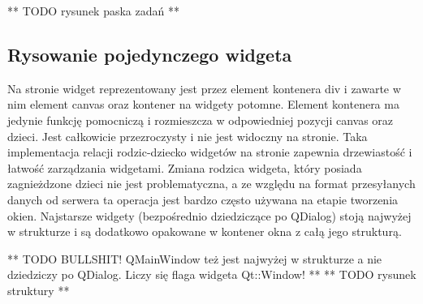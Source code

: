 ** TODO rysunek paska zadań **

\subsection{Rysowanie pojedynczego widgeta}
Na stronie widget reprezentowany jest przez element kontenera div i zawarte w nim element canvas oraz kontener na widgety potomne. Element kontenera ma jedynie funkcję pomocniczą i rozmieszcza w odpowiedniej pozycji canvas oraz dzieci. Jest całkowicie przezroczysty i nie jest widoczny na stronie. Taka implementacja relacji rodzic-dziecko widgetów na stronie zapewnia drzewiastość i łatwość zarządzania widgetami. Zmiana rodzica widgeta, który posiada zagnieżdzone dzieci nie jest problematyczna, a ze względu na format przesyłanych danych od serwera ta operacja jest bardzo często używana na etapie tworzenia okien. Najstarsze widgety (bezpośrednio dziedziczące po QDialog) stoją najwyżej w strukturze i są dodatkowo opakowane w kontener okna z całą jego strukturą.

** TODO BULLSHIT! QMainWindow też jest najwyżej w strukturze a nie dziedziczy po QDialog. Liczy się flaga widgeta Qt::Window! **
** TODO rysunek struktury **
